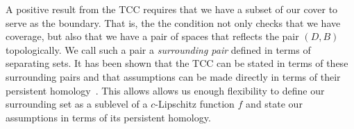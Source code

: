 
A positive result from the TCC requires that we have a subset of our cover to serve as the boundary.
That is, the the condition not only checks that we have coverage, but also that we have a pair of spaces that reflects the pair $(D, B)$ topologically.
We call such a pair a \emph{surrounding pair} defined in terms of separating sets.
It has been shown that the TCC can be stated in terms of these surrounding pairs and that assumptions can be made directly in terms of their persistent homology~\cite{cavanna2017when}.
This allows allows us enough flexibility to define our surrounding set as a sublevel of a $c$-Lipschitz function $f$ and state our assumptions in terms of its persistent homology.

%
